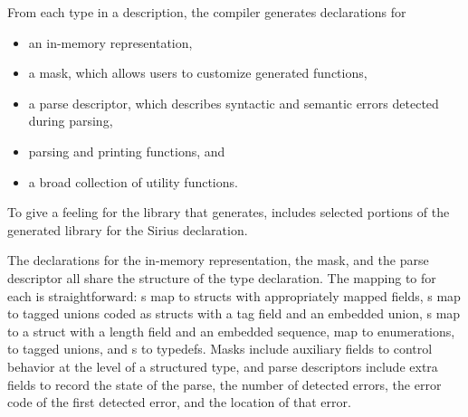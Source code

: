 \documentclass{sig-alternate}
\newcommand{\dibbler}{Sirius}
\begin{document}
From each type in a \pads{} description, the compiler generates 
\C{} declarations for
\begin{itemize}
\setlength{\itemsep}{0ex plus0.2ex}
\item an in-memory representation, 
\item a mask, which allows users to customize generated functions,
\item a parse descriptor, which describes syntactic and
semantic errors detected during parsing, 
\item parsing and printing functions, and 
\item a broad collection of utility functions.
\end{itemize}

\renewcommand{\topfraction}{0.85}
\renewcommand{\textfraction}{0.1}
\renewcommand{\floatpagefraction}{0.75}
\begin{figure*}
\begin{tiny}

\caption{Selected portions of the library generated for the \texttt{entry\_t}
  declaration from \dibbler{} data description.}
\label{figure:library}
\end{tiny}
\end{figure*}
To give a feeling for the library that \pads{} generates, 
 includes selected portions of the generated 
library for the \dibbler{}  declaration.

The \C{} declarations for the in-memory representation, the mask, 
and the parse descriptor all share the structure of the \pads{}
type declaration.  The mapping to \C{} for each is straightforward: 
s map to \C{} structs with appropriately mapped fields, 
s map to tagged unions coded as \C{} structs with a tag field 
and an embedded 
union, s map to a \C{} struct with a length field and an 
embedded sequence,  map to \C{} enumerations,  
to tagged unions, and s to \C{} typedefs.  Masks include
auxiliary fields to control behavior at the level of a structured
type, and parse descriptors include extra fields to record the 
state of the parse, the number of detected errors, 
the error code of the first detected error, and the location of that error.
\end{document}
